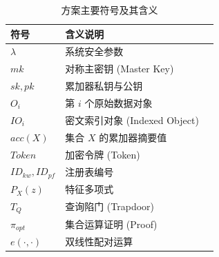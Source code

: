 \begin{table}[htbp]
	\centering
	\caption{方案主要符号及其含义}
	\label{tab:notations}
	\begin{tabular}{@{} l l l @{}}
		\toprule
		符号 & 含义说明 \\
		\midrule
		$\lambda$ & 系统安全参数 \\
		$mk$ & 对称主密钥 (Master Key) \\
		$sk, pk$ & 累加器私钥与公钥 \\
		$O_i$ & 第 $i$ 个原始数据对象 \\
		$IO_i$ & 密文索引对象 (Indexed Object) \\
		$acc(X)$ & 集合 $X$ 的累加器摘要值 \\
		$Token$ & 加密令牌 (Token) \\
		$ID_{kw}, ID_{pf}$ & 注册表编号 \\
		$P_X(z)$ & 特征多项式 \\
		$T_Q$ & 查询陷门 (Trapdoor) \\
		$\pi_{opt}$ & 集合运算证明 (Proof) \\
		$e(\cdot, \cdot)$ & 双线性配对运算 \\
		\bottomrule
	\end{tabular}
\end{table}